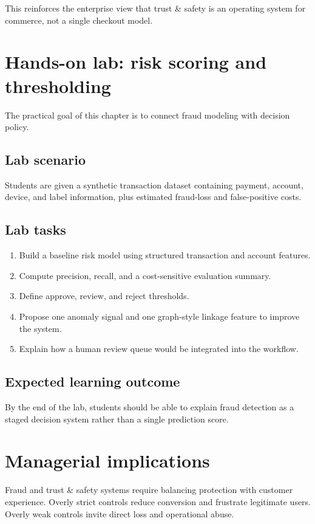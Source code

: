 This reinforces the enterprise view that trust \& safety is an operating system for commerce, not a single checkout model.

\section{Hands-on lab: risk scoring and thresholding}
The practical goal of this chapter is to connect fraud modeling with decision policy.

\subsection{Lab scenario}
Students are given a synthetic transaction dataset containing payment, account, device, and label information, plus estimated fraud-loss and false-positive costs.

\subsection{Lab tasks}
\begin{enumerate}
  \item Build a baseline risk model using structured transaction and account features.
  \item Compute precision, recall, and a cost-sensitive evaluation summary.
  \item Define approve, review, and reject thresholds.
  \item Propose one anomaly signal and one graph-style linkage feature to improve the system.
  \item Explain how a human review queue would be integrated into the workflow.
\end{enumerate}

\subsection{Expected learning outcome}
By the end of the lab, students should be able to explain fraud detection as a staged decision system rather than a single prediction score.

\section{Managerial implications}
Fraud and trust \& safety systems require balancing protection with customer experience.
Overly strict controls reduce conversion and frustrate legitimate users.
Overly weak controls invite direct loss and operational abuse.

